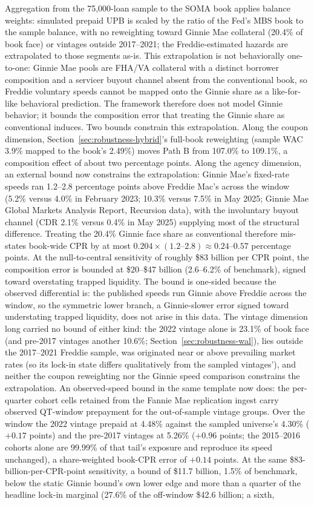\documentclass[12pt]{article}
\begin{document}
Aggregation from the 75,000-loan sample to the SOMA book applies balance weights: simulated prepaid UPB is scaled by the ratio of the Fed's MBS book to the sample balance, with no reweighting toward Ginnie Mae collateral (20.4\% of book face) or vintages outside 2017--2021; the Freddie-estimated hazards are extrapolated to those segments as-is. This extrapolation is not behaviorally one-to-one: Ginnie Mae pools are FHA/VA collateral with a distinct borrower composition and a servicer buyout channel absent from the conventional book, so Freddie voluntary speeds cannot be mapped onto the Ginnie share as a like-for-like behavioral prediction. The framework therefore does not model Ginnie behavior; it bounds the composition error that treating the Ginnie share as conventional induces. Two bounds constrain this extrapolation. Along the coupon dimension, Section~\ref{sec:robustness-hybrid}'s full-book reweighting (sample WAC 3.9\% mapped to the book's 2.49\%) moves Path B from 107.0\% to 109.1\%, a composition effect of about two percentage points. Along the agency dimension, an external bound now constrains the extrapolation: Ginnie Mae's fixed-rate speeds ran 1.2--2.8 percentage points above Freddie Mac's across the window (5.2\% versus 4.0\% in February 2023; 10.3\% versus 7.5\% in May 2025; Ginnie Mae Global Markets Analysis Report, Recursion data), with the involuntary buyout channel (CDR 2.1\% versus 0.4\% in May 2025) supplying most of the structural difference. Treating the 20.4\% Ginnie face share as conventional therefore mis-states book-wide CPR by at most $0.204 \times (1.2\text{--}2.8) \approx 0.24$--$0.57$ percentage points. At the null-to-central sensitivity of roughly \$83 billion per CPR point, the composition error is bounded at \$20--\$47 billion (2.6--6.2\% of benchmark), signed toward overstating trapped liquidity. The bound is one-sided because the observed differential is: the published speeds run Ginnie above Freddie across the window, so the symmetric lower branch, a Ginnie-slower error signed toward understating trapped liquidity, does not arise in this data. The vintage dimension long carried no bound of either kind: the 2022 vintage alone is 23.1\% of book face (and pre-2017 vintages another 10.6\%; Section~\ref{sec:robustness-wal}), lies outside the 2017--2021 Freddie sample, was originated near or above prevailing market rates (so its lock-in state differs qualitatively from the sampled vintages'), and neither the coupon reweighting nor the Ginnie speed comparison constrains the extrapolation. An observed-speed bound in the same template now does: the per-quarter cohort cells retained from the Fannie Mae replication ingest carry observed QT-window prepayment for the out-of-sample vintage groups. Over the window the 2022 vintage prepaid at 4.48\% against the sampled universe's 4.30\% ($+0.17$ points) and the pre-2017 vintages at 5.26\% ($+0.96$ points; the 2015--2016 cohorts alone are 99.99\% of that tail's exposure and reproduce its speed unchanged), a share-weighted book-CPR error of $+0.14$ points. At the same \$83-billion-per-CPR-point sensitivity, a bound of \$11.7 billion, 1.5\% of benchmark, below the static Ginnie bound's own lower edge and more than a quarter of the headline lock-in marginal (27.6\% of the off-window \$42.6 billion; a sixth, 
\end{document}
